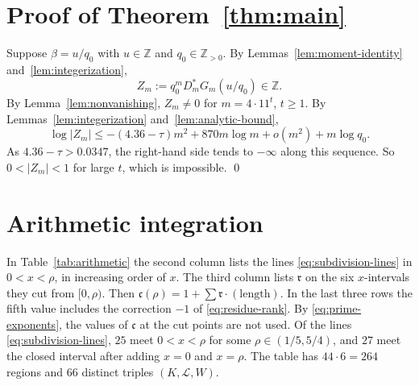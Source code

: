 \documentclass{amsart}
\numberwithin{equation}{section}
\numberwithin{table}{section}
\newcommand{\Z}{\mathbb{Z}}
\begin{document}
\section{Proof of Theorem~\ref{thm:main}}\label{sec:proof}

Suppose $\beta=u/q_0$ with $u\in\Z$ and $q_0\in\Z_{>0}$. By
Lemmas~\ref{lem:moment-identity} and~\ref{lem:integerization},
\[
Z_m:=q_0^mD_m^*G_m(u/q_0)\in\Z.
\]
By Lemma~\ref{lem:nonvanishing}, $Z_m\ne0$ for $m=4\cdot11^t$, $t\ge1$.
By Lemmas~\ref{lem:integerization} and~\ref{lem:analytic-bound},
\begin{equation*}
\log|Z_m|\le-(4.36-\tau)m^2+870m\log m+o(m^2)+m\log q_0.
\end{equation*}
As $4.36-\tau>0.0347$, the right-hand side tends to $-\infty$ along this
sequence. So $0<|Z_m|<1$ for large $t$, which is impossible.
\qed

\appendix

\section{Arithmetic integration}\label{app:arithmetic}
In Table~\ref{tab:arithmetic} the second column lists the lines
\eqref{eq:subdivision-lines} in $0<x<\rho$, in increasing order of $x$. The
third column lists $\mathfrak r$ on the six $x$-intervals they cut from
$[0,\rho)$. Then $\mathfrak c(\rho)=1+\sum\mathfrak r\cdot(\text{length})$. In the
last three rows the fifth value includes the correction $-1$ of
\eqref{eq:residue-rank}. By \eqref{eq:prime-exponents}, the values of $\mathfrak c$ at the cut points are not
used. Of the lines
\eqref{eq:subdivision-lines}, $25$ meet $0<x<\rho$ for some
$\rho\in(1/5,5/4)$, and $27$ meet the closed interval after adding $x=0$ and
$x=\rho$. The table has $44\cdot6=264$ regions and $66$ distinct
triples $(K,\mathcal L,W)$.
\end{document}
